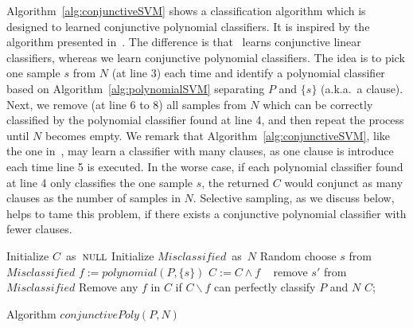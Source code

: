 Algorithm~\ref{alg:conjunctiveSVM} shows a classification algorithm which is designed to learned conjunctive polynomial classifiers.
It is inspired by the algorithm presented in~\cite{sharma2012interpolants}. The difference is that~\cite{sharma2012interpolants} learns conjunctive linear classifiers, whereas we learn conjunctive polynomial classifiers. The idea is to pick one sample $s$ from $N$ (at line 3) each time and identify a polynomial classifier based on Algorithm~\ref{alg:polynomialSVM} separating $P$ and $\{s\}$ (a.k.a.~a clause). Next, we remove (at line 6 to 8) all samples from $N$ which can be correctly classified by the polynomial classifier found at line 4, and then repeat the process until $N$ becomes empty.
We remark that Algorithm~\ref{alg:conjunctiveSVM}, like the one in~\cite{sharma2012interpolants}, may learn a classifier with many clauses, as one clause is introduce each time line 5 is executed. In the worse case, if each polynomial classifier found at line 4 only classifies the one sample $s$, the returned $C$ would conjunct as many clauses as the number of samples in $N$. Selective sampling, as we discuss below, helps to tame this problem, if there exists a conjunctive polynomial classifier with fewer clauses.

\begin{algorithm}[t]
\SetAlgoVlined
\Indm
\Indp
    Initialize $C$\ as\ $\textsc{null}$\; 
    Initialize $\mathit{Misclassified}$\ as\ $N$\;
     {
        Random choose $s$ from $\mathit{Misclassified}$\;
        $f := \mathit{polynomial}(P, \{s\})$\;
        $C := C \land f$\;
         {\
             {
                remove $s'$ from $\mathit{Misclassified}$\;
            }
        }
    }
    Remove any $f$ in $C$ if $C\backslash f$ can perfectly classify $P$ and $N$\;
    \Return $C$;
\caption{Algorithm $\mathit{conjunctivePoly}(P, N)$}
\label{alg:conjunctiveSVM}
\end{algorithm}



